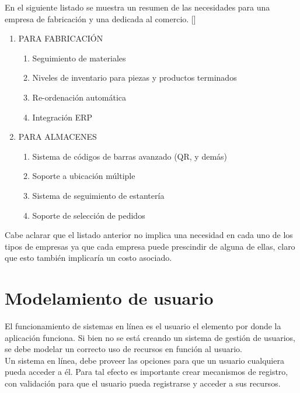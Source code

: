 En el siguiente listado se muestra un resumen de las necesidades para una empresa de fabricación y una dedicada al comercio. [\citep{PCD:2019:Online}]

\begin{enumerate}
\item PARA FABRICACIÓN
\begin{enumerate}
\item Seguimiento de materiales
\item Niveles de inventario para piezas y productos terminados
\item Re-ordenación automática
\item Integración ERP
\end{enumerate}
\item PARA ALMACENES
\begin{enumerate}
\item Sistema de códigos de barras avanzado (QR, y demás)
\item Soporte a ubicación múltiple
\item Sistema de seguimiento de estantería
\item Soporte de selección de pedidos
\end{enumerate}
\end{enumerate}

Cabe aclarar que el listado anterior no implica una necesidad en cada uno de los tipos de empresas ya que cada empresa puede prescindir de alguna de ellas, claro que esto también implicaría un costo asociado.

\section{Modelamiento de usuario}

El funcionamiento de sistemas en línea es el usuario el elemento por donde la aplicación funciona. Si bien no se está creando un sistema de gestión de usuarios, se debe modelar un correcto uso de recursos en función al usuario.\\

Un sistema en línea, debe proveer las opciones para que un usuario cualquiera pueda acceder a él. Para tal efecto es importante crear mecanismos de registro, con validación para que el usuario pueda registrarse y acceder a sus recursos.\\


